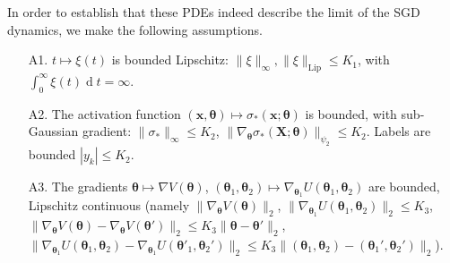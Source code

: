 \documentclass{article}
\theoremstyle{mystyle}
\newcommand{\diff}{\ensuremath{\operatorname{d}\!}}
\begin{document}
In order to establish that these PDEs indeed describe the limit of the SGD dynamics, we make the following assumptions.
%
\begin{itemize}\label{list: reg assumptions}
%
	\item[{\sf A1.}] $t\mapsto \xi(t)$ is bounded Lipschitz: $\|\xi\|_{\infty}, \|\xi\|_{\text{Lip}}\leq K_1$, with $\int_0^{\infty}\xi(t) \diff  t=\infty$.
%
\item[{\sf A2.}] The activation function $( \mathbf{x}, \mathbf{\theta})\mapsto \sigma_*( \mathbf{x}; \mathbf{ \theta})$ is bounded, with sub-Gaussian gradient: $\|\sigma_*\|_{\infty}\leq  K_2$, $\|\nabla_{ \mathbf{ \theta}}
\sigma_*( \mathbf{X}; \mathbf{\theta})\|_{\psi_2}\leq K_2$. Labels are bounded $|y_k|\leq K_2$.
%
\item[{\sf A3.}] The gradients $\mathbf{\theta}\mapsto \nabla V( \mathbf{\theta})$, $(\mathbf{\theta}_1,\mathbf{\theta}_2)\mapsto \nabla_{\mathbf{\theta}_1}U(\mathbf{\theta}_1,\mathbf{\theta}_2)$  are bounded, Lipschitz continuous 
(namely $\| \nabla_{\mathbf{\theta}}V(\mathbf{\theta}) \|_2$, $\|\nabla_{\mathbf{\theta}_1}U(\mathbf{\theta}_1,\mathbf{\theta}_2)\|_2\leq K_3$, $\|\nabla_{\mathbf{\theta}}V(\mathbf{\theta})-\nabla_{\mathbf{\theta}}V(\mathbf{\theta}')\|_2\leq K_3 \|\mathbf{\theta}-\mathbf{\theta}'\|_2$, $\|\nabla_{\mathbf{\theta}_1}U(\mathbf{\theta}_1,\mathbf{\theta}_2)-\nabla_{\mathbf{\theta}_1}U(\mathbf{\theta}'_1,\mathbf{\theta}_2')\|_2\leq K_3 \|(\mathbf{\theta}_1,\mathbf{\theta}_2)-
(\mathbf{\theta}_1',\mathbf{\theta}_2')\|_2$).
%
\end{itemize}
\end{document}
